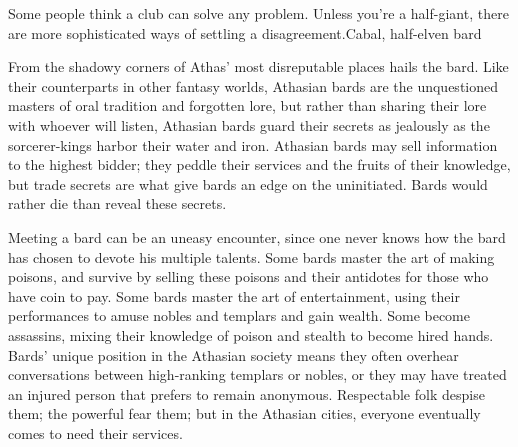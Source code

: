 {Some people think a club can solve any problem. Unless you're a half-giant, there are more sophisticated ways of settling a disagreement.}{Cabal, half-elven bard}

From the shadowy corners of Athas' most disreputable places hails the bard. Like their counterparts in other fantasy worlds, Athasian bards are the unquestioned masters of oral tradition and forgotten lore, but rather than sharing their lore with whoever will listen, Athasian bards guard their secrets as jealously as the sorcerer-kings harbor their water and iron. Athasian bards may sell information to the highest bidder; they peddle their services and the fruits of their knowledge, but trade secrets are what give bards an edge on the uninitiated. Bards would rather die than reveal these secrets.

Meeting a bard can be an uneasy encounter, since one never knows how the bard has chosen to devote his multiple talents. Some bards master the art of making poisons, and survive by selling these poisons and their antidotes for those who have coin to pay. Some bards master the art of entertainment, using their performances to amuse nobles and templars and gain wealth. Some become assassins, mixing their knowledge of poison and stealth to become hired hands. Bards' unique position in the Athasian society means they often overhear conversations between high-ranking templars or nobles, or they may have treated an injured person that prefers to remain anonymous. Respectable folk despise them; the powerful fear them; but in the Athasian cities, everyone eventually comes to need their services.

